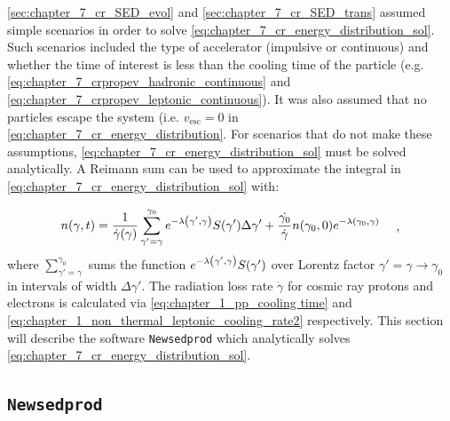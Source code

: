 \autoref{sec:chapter_7_cr_SED_evol} and \autoref{sec:chapter_7_cr_SED_trans} assumed simple scenarios in order to solve \autoref{eq:chapter_7_cr_energy_distribution_sol}. Such scenarios included the type of accelerator (impulsive or continuous) and whether the time of interest is less than the cooling time of the particle (e.g. \autoref{eq:chapter_7_crpropev_hadronic_continuous} and \autoref{eq:chapter_7_crpropev_leptonic_continuous}). It was also assumed that no particles escape the system (i.e. $v_\text{esc}=0$ in \autoref{eq:chapter_7_cr_energy_distribution}. For scenarios that do not make these assumptions, \autoref{eq:chapter_7_cr_energy_distribution_sol} must be solved analytically. A Reimann sum can be used to approximate the integral in \autoref{eq:chapter_7_cr_energy_distribution_sol} with:

\begin{equation}
    \begin{aligned}
	    n\qty(\gamma,t)&=\frac{1}{\dot{\gamma}\qty(\gamma)}\sum_{\gamma'=\gamma}^{\gamma_0} 	e^{-\lambda\qty(\gamma',\gamma)}S\qty(\gamma')\Delta \gamma' + 	\frac{\dot{\gamma_0}}{\dot{\gamma}}n\qty(\gamma_0,0)e^{-\lambda\qty(\gamma_0,\gamma)} 
    \end{aligned} \label{eq:chapter_7_single_zone_numerical}\text{ ,}
\end{equation}
\noindent where $\sum_{\gamma'=\gamma}^{\gamma_0}$ sums the function $e^{-\lambda\qty(\gamma',\gamma)}S\qty(\gamma')$ over Lorentz factor $\gamma'=\gamma\rightarrow \gamma_0$ in intervals of width $\Delta \gamma'$. The radiation loss rate $\dot{\gamma}$ for cosmic ray protons and electrons is calculated via \autoref{eq:chapter_1_pp_cooling time} and \autoref{eq:chapter_1_non_thermal_leptonic_cooling_rate2} respectively. This section will describe the software {\tt Newsedprod} which analytically solves \autoref{eq:chapter_7_cr_energy_distribution_sol}.

\subsection{{\tt Newsedprod}} \label{sec_chapter_7_newsedprod}

